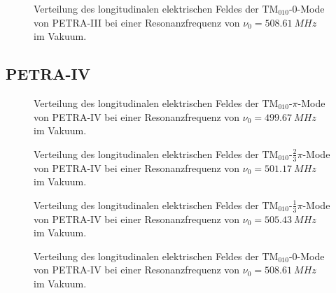 \begin{figure}[p]
  \centering
  
  \caption[Feldverteilung der $\mathrm{TM}_{010}\text{-}0$-Mode von PETRA-III]{Verteilung des longitudinalen elektrischen Feldes der $\mathrm{TM}_{010}\text{-}0$-Mode von PETRA-III bei einer Resonanzfrequenz von \mbox{$\nu_0 = \SI{508.61}{MHz}$} im Vakuum.}
\end{figure}
\FloatBarrier

\clearpage
\subsection{PETRA-IV}
\FloatBarrier

\vspace*{\fill}

\begin{figure}[h]
  \centering
  
  \caption[Feldverteilung der $\mathrm{TM}_{010}\text{-}\pi$-Mode von PETRA-IV]{Verteilung des longitudinalen elektrischen Feldes der $\mathrm{TM}_{010}\text{-}\pi$-Mode von PETRA-IV bei einer Resonanzfrequenz von \mbox{$\nu_0 = \SI{499.67}{MHz}$} im Vakuum.}
\end{figure}

\vspace*{\fill}

\begin{figure}[p]
	\centering
  
	
	\caption[Feldverteilung der $\mathrm{TM}_{010}\text{-}\frac{2}{3}\pi$-Mode von PETRA-IV]{Verteilung des longitudinalen elektrischen Feldes der $\mathrm{TM}_{010}\text{-}\frac{2}{3}\pi$-Mode von PETRA-IV bei einer Resonanzfrequenz von \mbox{$\nu_0 = \SI{501.17}{MHz}$} im Vakuum.}
	
    
    \caption[Feldverteilung der $\mathrm{TM}_{010}\text{-}\frac{1}{3}\pi$-Mode von PETRA-IV]{Verteilung des longitudinalen elektrischen Feldes der $\mathrm{TM}_{010}\text{-}\frac{1}{3}\pi$-Mode von PETRA-IV bei einer Resonanzfrequenz von \mbox{$\nu_0 = \SI{505.43}{MHz}$} im Vakuum.}
\end{figure}

\begin{figure}[h]
  \centering
  
  \caption[Feldverteilung der $\mathrm{TM}_{010}\text{-}0$-Mode von PETRA-IV]{Verteilung des longitudinalen elektrischen Feldes der $\mathrm{TM}_{010}\text{-}0$-Mode von PETRA-IV bei einer Resonanzfrequenz von \mbox{$\nu_0 = \SI{508.61}{MHz}$} im Vakuum.}
\end{figure}
\FloatBarrier

